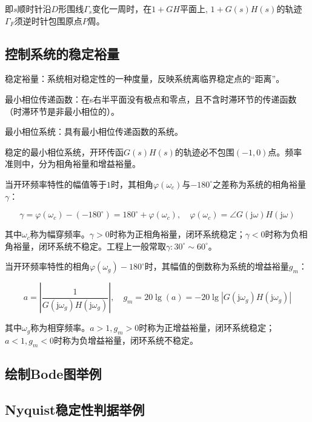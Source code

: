 \documentclass[cn, blue, normal, 12pt]{elegantnote}
\begin{document}
即$s$顺时针沿$D$形围线$\varGamma_s$变化一周时，在$1+GH$平面上, $1+G(s)H(s)$的轨迹$\varGamma_F$须逆时针包围原点$P$周。

\subsection{控制系统的稳定裕量}

稳定裕量：系统相对稳定性的一种度量，反映系统离临界稳定点的“距离”。

最小相位传递函数：在s右半平面没有极点和零点，且不含时滞环节的传递函数（时滞环节是非最小相位的）。

最小相位系统：具有最小相位传递函数的系统。

稳定的最小相位系统，开环传函$G(s)H(s)$的轨迹必不包围$(-1,0)$点。频率准则中，分为相角裕量和增益裕量。

当开环频率特性的幅值等于$1$时，其相角$\varphi(\omega_c)$与$-180^{\circ}$之差称为系统的相角裕量$\gamma$：

\begin{equation}
    \gamma=\varphi(\omega_c)-(-180^{\circ})=180^{\circ}+\varphi(\omega_c), \quad \varphi(\omega_c)=\angle{G(\mathrm{j}\omega)H(\mathrm{j}\omega)}
\end{equation}

其中$\omega_c$称为幅穿频率。$\gamma>0$时称为正相角裕量，闭环系统稳定；$\gamma<0$时称为负相角裕量，闭环系统不稳定。工程上一般常取$\gamma:30^{\circ}\sim 60^{\circ}$。

当开环频率特性的相角$\varphi(\omega_g)-180^{\circ}$时，其幅值的倒数称为系统的增益裕量$g_m$：

\begin{equation}
    a=\left|\frac{1}{G(\mathrm{j}\omega_g)H(\mathrm{j}\omega_g)}\right|, \quad g_m=20\lg{(a)}=-20\lg{|G(\mathrm{j}\omega_g)H(\mathrm{j}\omega_g)|}
\end{equation}

其中$\omega_g$称为相穿频率。$a>1, g_m>0$时称为正增益裕量，闭环系统稳定；$a<1, g_m<0$时称为负增益裕量，闭环系统不稳定。

\subsection{绘制Bode图举例}



\subsection{Nyquist稳定性判据举例}
\end{document}
